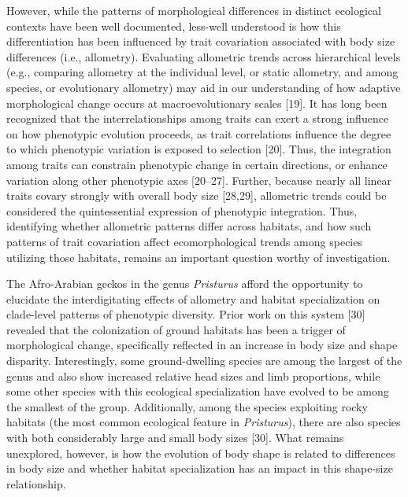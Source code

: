 \documentclass[
  11pt,
]{article}
\begin{document}
However, while the patterns of morphological differences in distinct
ecological contexts have been well documented, less-well understood is
how this differentiation has been influenced by trait covariation
associated with body size differences (i.e., allometry). Evaluating
allometric trends across hierarchical levels (e.g., comparing allometry
at the individual level, or static allometry, and among species, or
evolutionary allometry) may aid in our understanding of how adaptive
morphological change occurs at macroevolutionary scales {[}19{]}. It has
long been recognized that the interrelationships among traits can exert
a strong influence on how phenotypic evolution proceeds, as trait
correlations influence the degree to which phenotypic variation is
exposed to selection {[}20{]}. Thus, the integration among traits can
constrain phenotypic change in certain directions, or enhance variation
along other phenotypic axes {[}20--27{]}. Further, because nearly all
linear traits covary strongly with overall body size {[}28,29{]},
allometric trends could be considered the quintessential expression of
phenotypic integration. Thus, identifying whether allometric patterns
differ across habitats, and how such patterns of trait covariation
affect ecomorphological trends among species utilizing those habitats,
remains an important question worthy of investigation. \hfill\break

The Afro-Arabian geckos in the genus \emph{Pristurus} afford the
opportunity to elucidate the interdigitating effects of allometry and
habitat specialization on clade-level patterns of phenotypic diversity.
Prior work on this system {[}30{]} revealed that the colonization of
ground habitats has been a trigger of morphological change, specifically
reflected in an increase in body size and shape disparity.
Interestingly, some ground-dwelling species are among the largest of the
genus and also show increased relative head sizes and limb proportions,
while some other species with this ecological specialization have
evolved to be among the smallest of the group. Additionally, among the
species exploiting rocky habitats (the most common ecological feature in
\emph{Pristurus}), there are also species with both considerably large
and small body sizes {[}30{]}. What remains unexplored, however, is how
the evolution of body shape is related to differences in body size and
whether habitat specialization has an impact in this shape-size
relationship. \hfill\break
\end{document}
